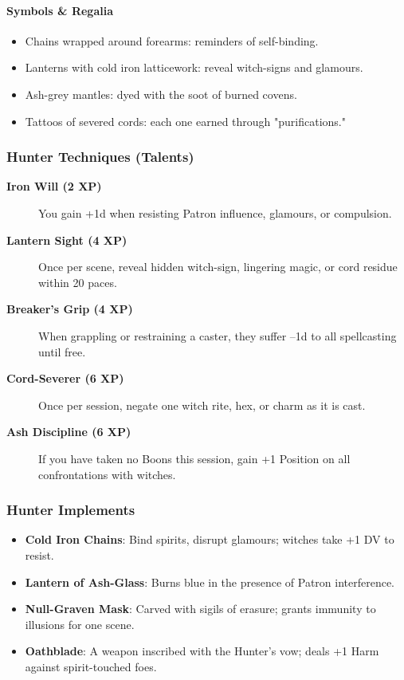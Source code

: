 \documentclass[11pt]{book}
\begin{document}
\paragraph{Symbols \& Regalia}
\begin{itemize}
    \item Chains wrapped around forearms: reminders of self-binding.
    \item Lanterns with cold iron latticework: reveal witch-signs and glamours.
    \item Ash-grey mantles: dyed with the soot of burned covens.
    \item Tattoos of severed cords: each one earned through "purifications."
\end{itemize}

\subsubsection{Hunter Techniques (Talents)}
\begin{description}
    \item[\textbf{Iron Will (2 XP)}]  
    You gain +1d when resisting Patron influence, glamours, or compulsion.

    \item[\textbf{Lantern Sight (4 XP)}]  
    Once per scene, reveal hidden witch-sign, lingering magic, or cord residue within 20 paces.

    \item[\textbf{Breaker's Grip (4 XP)}]  
    When grappling or restraining a caster, they suffer --1d to all spellcasting until free.

    \item[\textbf{Cord-Severer (6 XP)}]  
    Once per session, negate one witch rite, hex, or charm as it is cast.

    \item[\textbf{Ash Discipline (6 XP)}]  
    If you have taken no Boons this session, gain +1 Position on all confrontations with witches.
\end{description}

\subsubsection{Hunter Implements}
\begin{itemize}
    \item \textbf{Cold Iron Chains}: Bind spirits, disrupt glamours; witches take +1 DV to resist.
    \item \textbf{Lantern of Ash-Glass}: Burns blue in the presence of Patron interference.
    \item \textbf{Null-Graven Mask}: Carved with sigils of erasure; grants immunity to illusions for one scene.
    \item \textbf{Oathblade}: A weapon inscribed with the Hunter's vow; deals +1 Harm against spirit-touched foes.
\end{itemize}
\end{document}

